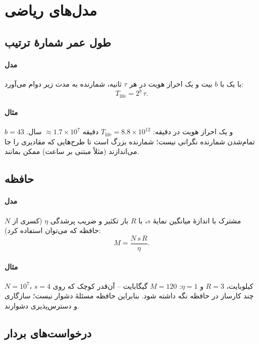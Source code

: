 \documentclass[11pt,a4paper]{article}
\begin{document}
\section{مدل‌های ریاضی}

\subsection{طول عمر شمارهٔ ترتیب}\label{sec:sqn}
\paragraph{مدل} با یک  با $b$ بیت و یک احراز هویت در هر $\tau$ ثانیه، شمارنده به مدت زیر دوام می‌آورد:
\begin{equation}\label{eq:sqnlife}
  T_{\mathrm{life}} = 2^{b}\,\tau .
\end{equation}
\paragraph{مثال} $b = 43$ و یک احراز هویت در دقیقه: $T_{\mathrm{life}} = 8.8\times10^{12}$ دقیقه $\approx 1.7\times10^{7}$
سال. تمام‌شدن شمارنده نگرانی نیست؛ شمارنده بزرگ است تا طرح‌هایی که مقادیری را جا می‌اندازند (مثلاً 
مبتنی بر ساعت) ممکن بمانند.

\subsection{حافظه}\label{sec:storage}
\paragraph{مدل} $N$ مشترک با اندازهٔ میانگین نمایهٔ $s$، با $R$ بار تکثیر و ضریب پرشدگی $\eta$ (کسری از حافظه که
می‌توان استفاده کرد):
\begin{equation}\label{eq:storage}
  M = \frac{N\,s\,R}{\eta}.
\end{equation}
\paragraph{مثال} $N = 10^7$، $s = 4$ کیلوبایت، $R = 3$ و $\eta = 1$: $M = 120$ گیگابایت -- آن‌قدر کوچک که روی چند
کارساز در حافظه نگه داشته شود. بنابراین حافظه مسئلهٔ دشوار نیست؛ سازگاری و دسترس‌پذیری دشوارند.

\subsection{درخواست‌های بردار}\label{sec:air}
\end{document}
